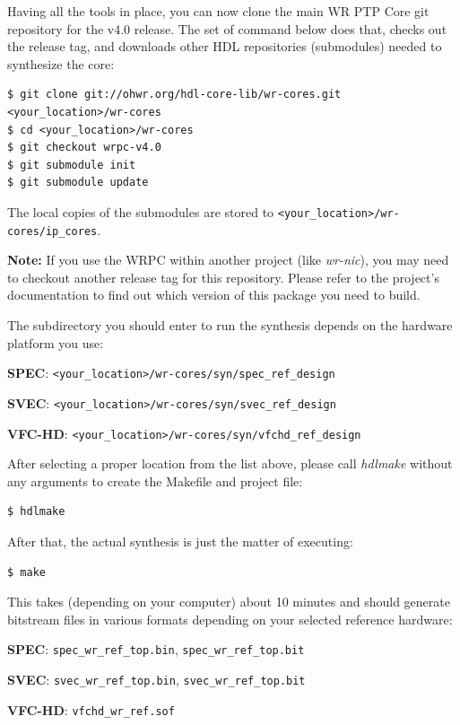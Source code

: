 \documentclass[a4paper, 12pt]{article}
\begin{document}
Having all the tools in place, you can now clone the main WR PTP Core git
repository for the v4.0 release. The set of command below does that, checks out
the release tag, and downloads other HDL repositories (submodules) needed to
synthesize the core:
\begin{lstlisting}
$ git clone git://ohwr.org/hdl-core-lib/wr-cores.git <your_location>/wr-cores
$ cd <your_location>/wr-cores
$ git checkout wrpc-v4.0
$ git submodule init
$ git submodule update
\end{lstlisting}

The local copies of the submodules are stored to
\texttt{<your\_location>/wr-cores/ip\_cores}.

\vspace{1em}
\textbf{Note:} If you use the WRPC within another project (like
\textit{wr-nic}), you may need to checkout another release tag for this
repository. Please refer to the project's documentation to find out which
version of this package you need to build.

\vspace{1em}
The subdirectory you should enter to run the synthesis depends on the hardware
platform you use:
\begin{itemize*}
  \item \textbf{SPEC}: \texttt{<your\_location>/wr-cores/syn/spec\_ref\_design}
  \item \textbf{SVEC}: \texttt{<your\_location>/wr-cores/syn/svec\_ref\_design}
  \item \textbf{VFC-HD}: \texttt{<your\_location>/wr-cores/syn/vfchd\_ref\_design}
\end{itemize*}

After selecting a proper location from the list above, please call
\textit{hdlmake} without any arguments to create the Makefile and project file:
\begin{lstlisting}
$ hdlmake
\end{lstlisting}

After that, the actual synthesis is just the matter of executing:
\begin{lstlisting}
$ make
\end{lstlisting}

This takes (depending on your computer) about 10 minutes and should generate
bitstream files in various formats depending on your selected reference
hardware:
\begin{itemize*}
  \item \textbf{SPEC}: \texttt{spec\_wr\_ref\_top.bin}, \texttt{spec\_wr\_ref\_top.bit}
  \item \textbf{SVEC}: \texttt{svec\_wr\_ref\_top.bin}, \texttt{svec\_wr\_ref\_top.bit}
  \item \textbf{VFC-HD}: \texttt{vfchd\_wr\_ref.sof}
\end{itemize*}
\end{document}
